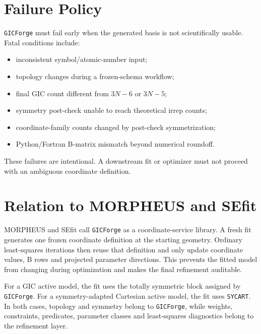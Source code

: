 \documentclass[11pt]{article}
\newcommand{\program}{\texttt{GICForge}}
\begin{document}
\section{Failure Policy}

\program{} must fail early when the generated basis is not scientifically
usable.  Fatal conditions include:

\begin{itemize}
  \item inconsistent symbol/atomic-number input;
  \item topology changes during a frozen-schema workflow;
  \item final GIC count different from \(3N-6\) or \(3N-5\);
  \item symmetry post-check unable to reach theoretical irrep counts;
  \item coordinate-family counts changed by post-check symmetrization;
  \item Python/Fortran B-matrix mismatch beyond numerical roundoff.
\end{itemize}

\noindent
These failures are intentional.  A downstream fit or optimizer must not proceed
with an ambiguous coordinate definition.

\section{Relation to MORPHEUS and SEfit}

MORPHEUS and SEfit call \program{} as a coordinate-service library.  A fresh fit
generates one frozen coordinate definition at the starting geometry.  Ordinary
least-squares iterations then reuse that definition and only update coordinate
values, B rows and projected parameter directions.  This prevents the fitted
model from changing during optimization and makes the final refinement
auditable.

For a GIC active model, the fit uses the totally symmetric block assigned by
\program{}.  For a symmetry-adapted Cartesian active model, the fit uses
\texttt{SYCART}.  In both cases, topology and symmetry belong to
\program{}, while weights, constraints, predicates, parameter classes and
least-squares diagnostics belong to the refinement layer.
\end{document}
